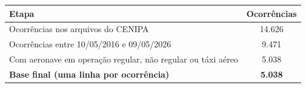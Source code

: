 \begin{tabular}{lc}
\toprule
\textbf{Etapa} & \textbf{Ocorrências} \\
\midrule
Ocorrências nos arquivos do CENIPA & 14.626 \\
Ocorrências entre 10/05/2016 e 09/05/2026 & 9.471 \\
Com aeronave em operação regular, não regular ou táxi aéreo & 5.038 \\
\textbf{Base final (uma linha por ocorrência)} & \textbf{5.038} \\
\bottomrule
\end{tabular}
